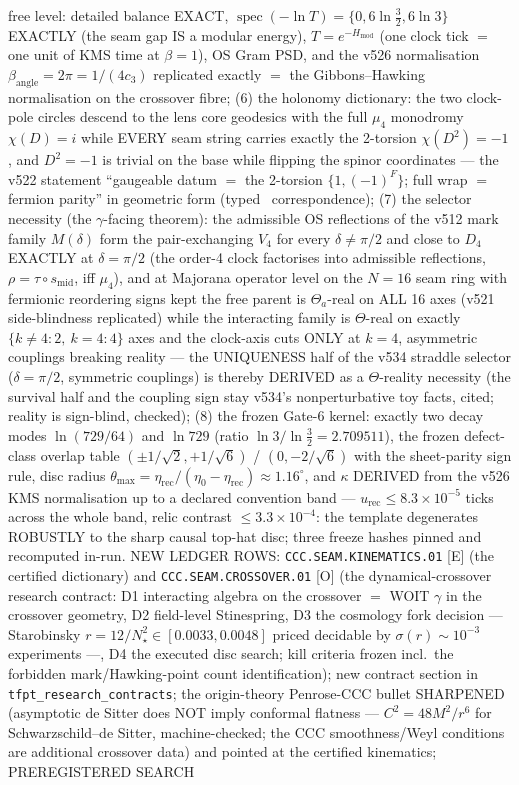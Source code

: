 \documentclass[11pt]{article}
\begin{document}
free level: detailed balance EXACT, $\operatorname{spec}(-\ln T) = \{0, 6\ln\frac32, 6\ln3\}$ EXACTLY (the seam gap IS a modular energy), $T = e^{-H_{\mathrm{mod}}}$ (one clock tick $=$ one unit of KMS time at $\beta = 1$), OS Gram PSD, and the v526 normalisation $\beta_{\mathrm{angle}} = 2\pi = 1/(4c_3)$ replicated exactly $=$ the Gibbons--Hawking normalisation on the crossover fibre; (6) the holonomy dictionary: the two clock-pole circles descend to the lens core geodesics with the full $\mu_4$ monodromy $\chi(D) = i$ while EVERY seam string carries exactly the 2-torsion $\chi(D^2) = -1$, and $D^2 = -1$ is trivial on the base while flipping the spinor coordinates --- the v522 statement ``gaugeable datum $=$ the 2-torsion $\{1, (-1)^F\}$; full wrap $=$ fermion parity'' in geometric form (typed \mC\ correspondence); (7) the selector necessity (the $\gamma$-facing theorem): the admissible OS reflections of the v512 mark family $M(\delta)$ form the pair-exchanging $V_4$ for every $\delta \neq \pi/2$ and close to $D_4$ EXACTLY at $\delta = \pi/2$ (the order-4 clock factorises into admissible reflections, $\rho = \tau \circ s_{\mathrm{mid}}$, iff $\mu_4$), and at Majorana operator level on the $N = 16$ seam ring with fermionic reordering signs kept the free parent is $\Theta_a$-real on ALL 16 axes (v521 side-blindness replicated) while the interacting family is $\Theta$-real on exactly $\{k \neq 4: 2,\ k = 4: 4\}$ axes and the clock-axis cuts ONLY at $k = 4$, asymmetric couplings breaking reality --- the UNIQUENESS half of the v534 straddle selector ($\delta = \pi/2$, symmetric couplings) is thereby DERIVED as a $\Theta$-reality necessity (the survival half and the coupling sign stay v534's nonperturbative toy facts, cited; reality is sign-blind, checked); (8) the frozen Gate-6 kernel: exactly two decay modes $\ln(729/64)$ and $\ln 729$ (ratio $\ln3/\ln\frac32 = 2.709511$), the frozen defect-class overlap table $(\pm1/\sqrt2, +1/\sqrt6)$ / $(0, -2/\sqrt6)$ with the sheet-parity sign rule, disc radius $\theta_{\max} = \eta_{\mathrm{rec}}/(\eta_0 - \eta_{\mathrm{rec}}) \approx 1.16^\circ$, and $\kappa$ DERIVED from the v526 KMS normalisation up to a declared convention band --- $u_{\mathrm{rec}} \le 8.3\times10^{-5}$ ticks across the whole band, relic contrast $\le 3.3\times10^{-4}$: the template degenerates ROBUSTLY to the sharp causal top-hat disc; three freeze hashes pinned and recomputed in-run.  NEW LEDGER ROWS: \texttt{CCC.SEAM.KINEMATICS.01} [E] (the certified dictionary) and \texttt{CCC.SEAM.CROSSOVER.01} [O] (the dynamical-crossover research contract: D1 interacting algebra on the crossover $=$ WOIT $\gamma$ in the crossover geometry, D2 field-level Stinespring, D3 the cosmology fork decision --- Starobinsky $r = 12/N_\star^2 \in [0.0033, 0.0048]$ priced decidable by $\sigma(r) \sim 10^{-3}$ experiments ---, D4 the executed disc search; kill criteria frozen incl.\ the forbidden mark/Hawking-point count identification); new contract section in \texttt{tfpt\_research\_contracts}; the origin-theory Penrose-CCC bullet SHARPENED (asymptotic de Sitter does NOT imply conformal flatness --- $C^2 = 48M^2/r^6$ for Schwarzschild--de Sitter, machine-checked; the CCC smoothness/Weyl conditions are additional crossover data) and pointed at the certified kinematics; PREREGISTERED SEARCH 
\end{document}
